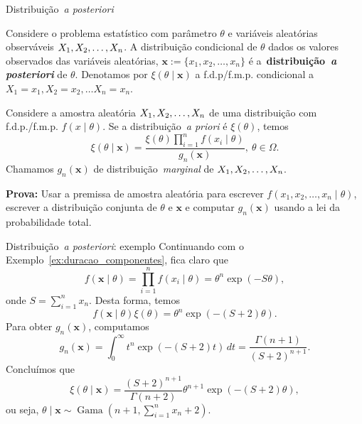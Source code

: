 \begin{frame}{Distribuição~\textit{a posteriori}}
\begin{defn}
 \label{def:posterior}
 Considere o problema estatístico com parâmetro $\theta$ e variáveis aleatórias observáveis $X_1, X_2, \ldots, X_n$.
 A distribuição condicional de $\theta$ dados os valores observados das variáveis aleatórias, $\boldsymbol x := \{x_1, x_2, \ldots, x_n \}$ é a~\textbf{distribuição~\textit{a posteriori}} de $\theta$.
 Denotamos por $\xi(\theta \mid \boldsymbol x)$ a f.d.p/f.m.p. condicional a $X_1 = x_1, X_2 = x_2, \ldots X_n = x_n$.
\end{defn}
\begin{theo}
 \label{thm:posterior_distribution}
 Considere a amostra aleatória $X_1, X_2, \ldots, X_n$ de uma distribuição com f.d.p./f.m.p. $f(x\mid\theta)$.
 Se a distribuição~\textit{a priori} é $\xi(\theta)$, temos
 \begin{equation}
  \label{eq:posterior}
    \xi(\theta \mid \boldsymbol x) = \frac{\xi(\theta)\prod_{i=1}^n f(x_i \mid \theta)}{g_n(\boldsymbol x)}, \: \theta \in \Omega.  
 \end{equation}
 Chamamos $g_n(\boldsymbol x)$ de distribuição~\textit{marginal} de $X_1, X_2, \ldots, X_n$.
\end{theo}
\textbf{Prova:} Usar a premissa de amostra aleatória para escrever $f(x_1, x_2, \ldots, x_n \mid \theta)$, escrever a distribuição conjunta de $\theta$ e $\boldsymbol x$ e computar $g_n(\boldsymbol x)$ usando a lei da probabilidade total. 
\end{frame}
\begin{frame}{Distribuição~\textit{a posteriori}: exemplo}
Continuando com o Exemplo~\ref{ex:duracao_componentes}, fica claro que 
 \[f (\boldsymbol x  \mid \theta) = \prod_{i=1}^n f(x_i \mid \theta) = \theta^n\exp(-S\theta), \]
onde $S = \sum_{i = 1}^n x_n$.
Desta forma, temos 
\[ f (\boldsymbol x  \mid \theta)\xi(\theta) = \theta^{n}\exp(-(S + 2)\theta).\]
Para obter $g_n(\boldsymbol{x})$, computamos 
\[ g_n(\boldsymbol{x}) = \int_0^\infty t^{n}\exp(-(S + 2)t) \,dt = \frac{\Gamma( n + 1) }{ (S + 2)^{n + 1}}. \]
Concluímos que 
\[\xi(\theta \mid \boldsymbol{x}) = \frac{(S + 2)^{n + 1}}{\Gamma( n + 2)} \theta^{n+1}\exp(-(S + 2)\theta),  \]
ou seja, $\theta \mid \boldsymbol{x} \sim \operatorname{Gama}(n + 1, \sum_{i = 1}^n x_n + 2)$.
\end{frame}
